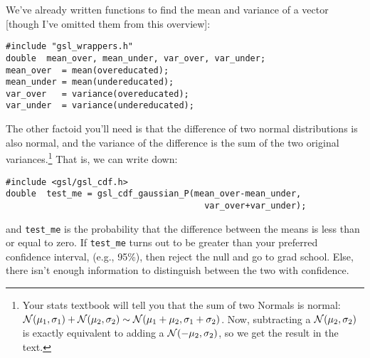 We've already written functions to find the mean and variance of a vector
[though I've omitted them from this overview]:

\begin{verbatim}
#include "gsl_wrappers.h"
double	mean_over, mean_under, var_over, var_under;
mean_over  = mean(overeducated);
mean_under = mean(undereducated);
var_over   = variance(overeducated);
var_under  = variance(undereducated);
\end{verbatim}

The other factoid you'll need is that the difference of two normal
distributions is also normal, and the variance of the difference is
the sum of the two original variances.\footnote{Your stats textbook
will tell you that the sum of two Normals is normal: ${\cal N}(\mu_1,
\sigma_1) + {\cal N}(\mu_2, \sigma_2) \sim {\cal N}(\mu_1 + \mu_2,
\sigma_1 + \sigma_2)$. Now, subtracting a ${\cal N}(\mu_2, \sigma_2)$
is exactly equivalent to adding a ${\cal N}(-\mu_2, \sigma_2)$, so we
get the result in the text.} That is, we can write down:

\begin{verbatim}
#include <gsl/gsl_cdf.h>
double	test_me = gsl_cdf_gaussian_P(mean_over-mean_under, 
                                       var_over+var_under);
\end{verbatim}

and {\tt test\_me} is the probability that the difference between the
means is less than or equal to zero. If {\tt test\_me} turns out to be greater
than your preferred confidence interval, (e.g., 95\%), then reject the
null and go to grad school. Else, there isn't enough information to
distinguish between the two with confidence.

